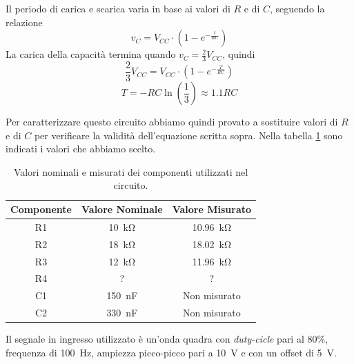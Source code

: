 \noindent
Il periodo di carica e scarica varia in base ai valori di $R$ e di $C$, seguendo la relazione
\[v_C = V_{CC}\cdot\left(1-e^{-\frac{t}{RC}}\right)\]
La carica della capacità termina quando $v_C = \frac{2}{3}V_{CC}$, quindi
\[\frac{2}{3}V_{CC} = V_{CC}\cdot\left(1-e^{-\frac{T}{RC}}\right)\]
\[T=-RC\ln\left(\frac{1}{3}\right)\approx1.1RC\]

Per caratterizzare questo circuito abbiamo quindi provato a sostituire valori di $R$ e di $C$ per verificare la validità dell'equazione scritta sopra. Nella tabella \ref{tab:valori_componenti_2} sono indicati i valori che abbiamo scelto.

\def\arraystretch{1.3}
\begin{table}[h]
	\centering
	\begin{tabular}{|c|c|c|}
		\hline
		Componente	& Valore Nominale & Valore Misurato \\ \hline
		R1 &\SI{10}{\kilo\ohm} & \SI{10,96}{\kilo\ohm} \\ \hline
		R2 &\SI{18}{\kilo\ohm} & \SI{18,02}{\kilo\ohm} \\ \hline
		R3 & \SI{12}{\kilo\ohm} & \SI{11,96}{\kilo\ohm} \\ \hline
		R4 & ? & ? \\ \hline
		C1 & \SI{150}{\nano\farad} & Non misurato \\ \hline
		C2 & \SI{330}{\nano\farad} & Non misurato \\ \hline
	\end{tabular}
	\caption{Valori nominali e misurati dei componenti utilizzati nel circuito.}
	\label{tab:valori_componenti_2}
\end{table}
Il segnale in ingresso utilizzato è un'onda quadra con \textit{duty-cicle} pari al 80\%, frequenza di \SI{100}{\hertz}, ampiezza picco-picco pari a \SI{10}{\volt} e con un offset di \SI{5}{\volt}.
